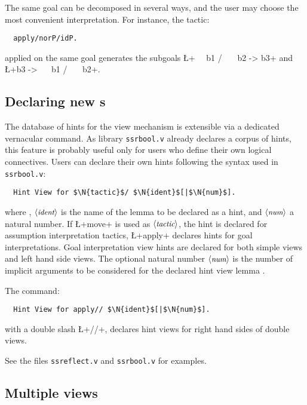 The same goal can be decomposed in several ways, and the user may
choose the most convenient interpretation. For instance, the tactic:
\begin{lstlisting}
  apply/norP/idP.
\end{lstlisting}
applied on the same goal  generates the subgoals
\L+~~  b1 /\ ~~  b2 -> b3+ and\\
\L+b3 -> ~~  b1 /\ ~~  b2+.


\subsection{Declaring new s}\label{ssec:vhints}

The database of hints for the view mechanism is extensible via a
dedicated vernacular command. As library {\tt ssrbool.v} already
declares a corpus of hints, this feature is probably useful only for
users who define their own logical connectives. Users can declare
their own hints following the syntax used in {\tt ssrbool.v}:

\begin{lstlisting}
  Hint View for $\N{tactic}$/ $\N{ident}$[|$\N{num}$].
\end{lstlisting}
where , $\langle\mbox{\itshape\rmfamily\small ident}\rangle$ is the
name of the lemma to be declared as a hint, and $\langle\mbox{\itshape\rmfamily\small num}\rangle$ a natural
number. If \L+move+ is used as $\langle\mbox{\itshape\rmfamily\small tactic}\rangle$, the hint is declared for
assumption interpretation tactics, \L+apply+ declares hints for goal
interpretations.
Goal interpretation view hints are declared for both simple views and
left hand side views. The optional natural number $\langle\mbox{\itshape\rmfamily\small num}\rangle$ is the
number of implicit arguments to be considered for the declared hint
view lemma .

The command:
\begin{lstlisting}
  Hint View for apply// $\N{ident}$[|$\N{num}$].
\end{lstlisting}
with a double slash \L+//+, declares hint views for right hand sides of
double views.


\noindent See the files {\tt ssreflect.v} and {\tt ssrbool.v} for examples.

\subsection{Multiple views}\label{ssec:multiview}

